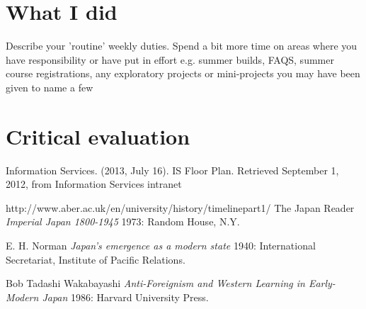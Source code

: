 \documentclass[10pt,a4paper,headinclude=true]{report}
\begin{document}
\chapter{What I did}
Describe your 'routine' weekly duties. Spend a bit more time on areas where you have
responsibility or have put in effort e.g. summer builds, FAQS, summer course
registrations, any exploratory projects or mini-projects you may have been given to
name a few \cite{notes}

\chapter{Critical evaluation}
\begin{thebibliography}{1}

 Information Services. (2013, July 16). IS Floor Plan. Retrieved September 1, 2012, from Information Services intranet

 http://www.aber.ac.uk/en/university/history/timelinepart1/
  The Japan Reader {\em Imperial Japan 1800-1945} 1973:
Random House, N.Y.

 E. H. Norman {\em Japan's emergence as a modern
state} 1940: International Secretariat, Institute of Pacific
Relations.

 Bob Tadashi Wakabayashi {\em Anti-Foreignism and Western
Learning in Early-Modern Japan} 1986: Harvard University Press.

\end{thebibliography}
\end{document}
